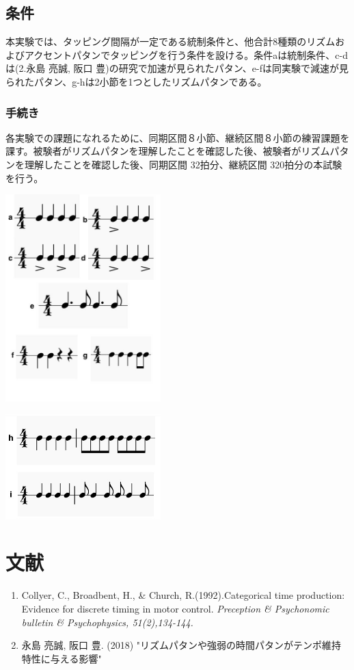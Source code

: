 \documentclass[twocolumn,10pt]{jarticle}
\begin{document}
\subsection{条件}
本実験では、タッピング間隔が一定である統制条件と、他合計8種類のリズムおよびアクセントパタンでタッピングを行う条件を設ける。条件aは統制条件、c-dは(2.永島 亮誠, 阪口 豊)の研究で加速が見られたパタン、e-fは同実験で減速が見られたパタン、g-hは2小節を1つとしたリズムパタンである。
\subsubsection{手続き}
各実験での課題になれるために、同期区間８小節、継続区間８小節の練習課題を課す。被験者がリズムパタンを理解したことを確認した後、被験者がリズムパタンを理解したことを確認した後、同期区間 32拍分、継続区間 320拍分の本試験を行う。
\begin{center}
	\includegraphics[width=6cm]{patna_g.jpeg}
\end{center}	
\begin{center}
	\includegraphics[width=6cm]{patnh_i.jpeg}
\end{center}	






\section{文献}
\begin{enumerate}
  \item Collyer, C., Broadbent, H., \& Church, R.(1992).Categorical time production: Evidence for discrete timing in motor control. {\it Preception \& Psychonomic bulletin \& Psychophysics, 51(2),134-144.}
  \item 永島 亮誠, 阪口 豊. (2018) "リズムパタンや強弱の時間パタンがテンポ維持特性に与える影響"
\end{enumerate}
\end{document}
